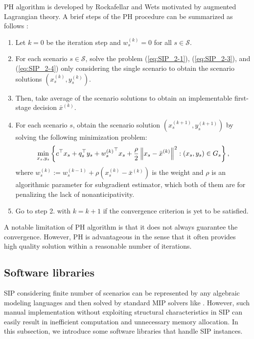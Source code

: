 PH algorithm is developed by Rockafellar and Wets \cite{journal:RW1991} motivated by augmented Lagrangian theory. 
A brief steps of the PH procedure can be summarized as follows \cite{book:pyomo}:
\begin{enumerate}
	\item Let $k=0$ be the iteration step and $w_s^{(k)}=0$ for all $s\in\mathcal{S}$.
	\item For each scenario $s\in\mathcal{S}$, solve the problem (\ref{eq:SIP_2-1}), (\ref{eq:SIP_2-3}), and (\ref{eq:SIP_2-4}) only considering the single scenario to obtain the scenario solutions $(x_s^{(k)},y_s^{(k)})$.
	\item Then, take average of the scenario solutions to obtain an implementable first-stage decision $\bar{x}^{(k)}$.
	\item For each scenario $s$, obtain the scenario solution $(x_s^{(k+1)},y_s^{(k+1)})$ by solving the following minimization problem:
	\begin{align*}
	\min_{x_s,y_s}\left\{c^\top x_s+q_s^\top y_s + {w_s^{(k)}}^\top x_s +\frac{\rho}{2}\left\lVert x_s-\bar{x}^{(k)}\right\rVert^2 : (x_s,y_s)\in G_s \right\},
	\end{align*}
	where ${w_s^{(k)}}:={w_s^{(k-1)}}+\rho(x_s^{(k)}-\bar{x}^{(k)})$ is the weight and $\rho$ is an algorithmic parameter for subgradient estimator, which both of them are for penalizing the lack of nonanticipativity.
	\item Go to step 2. with $k=k+1$ if the convergence criterion is yet to be satisfied. 
\end{enumerate}
A notable limitation of PH algorithm is that it does not always guarantee the convergence. However, PH is advantageous in the sense that it often provides high quality solution within a reasonable number of iterations. 
\subsection{Software libraries}
SIP considering finite number of scenarios can be represented by any algebraic modeling languages and then solved by standard MIP solvers like \cplex. However, such manual implementation without exploiting structural characteristics in SIP can easily result in inefficient computation and unnecessary memory allocation. In this subsection, we introduce some software libraries that handle SIP instances.

